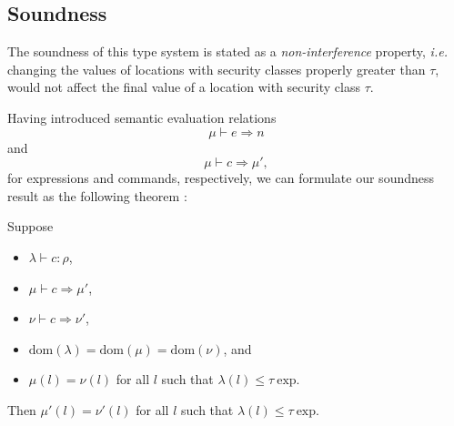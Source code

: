 \documentclass{llncs}
\newcommand{\lit}[1]{\mathrm{#1}}
\begin{document}
\subsection{Soundness}

The soundness of this type system is stated as a \textit{non-interference} property, \textit{i.e.} changing the values of locations with security classes properly greater than $\tau$, would not affect the final value of a location with security class $\tau$.

Having introduced semantic evaluation relations
\[
\mu \vdash e \Rightarrow n
\]
and
\[
\mu \vdash c \Rightarrow \mu',
\]
for expressions and commands, respectively, we can formulate our soundness result as the following theorem \cite{VolpanoIS96}:

\begin{theorem}[Soundness]
Suppose
\begin{itemize}
    \item $\lambda \vdash c : \rho$,
    \item $\mu \vdash c \Rightarrow \mu'$,
    \item $\nu \vdash c \Rightarrow \nu'$,
    \item $\lit{dom}(\lambda) = \lit{dom}(\mu) = \lit{dom}(\nu)$, and
    \item $\mu(l) = \nu(l)$ for all $l$ such that $\lambda(l) \leq \tau\ \lit{exp}$.
\end{itemize}
Then $\mu'(l) = \nu'(l)$ for all $l$ such that $\lambda(l) \leq \tau\ \lit{exp}$.
\end{theorem}


{}
\end{document}
